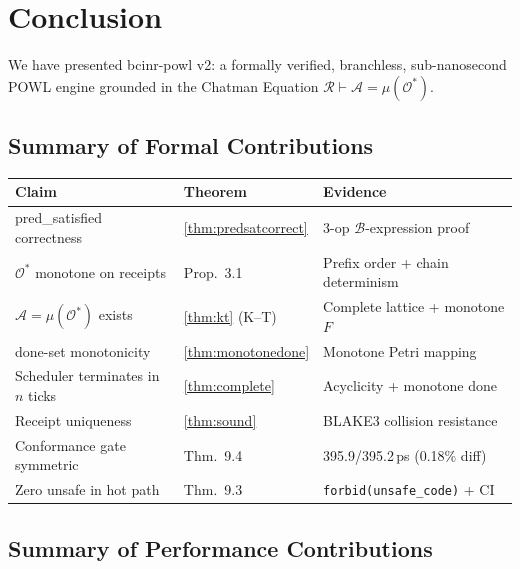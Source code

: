 \documentclass[12pt,a4paper]{article}
\theoremstyle{definition}
\theoremstyle{remark}
\newcommand{\Ostar}{\mathcal{O}^{*}}
\newcommand{\Agency}{\mathcal{A}}
\newcommand{\Reality}{\mathcal{R}}
\begin{document}
\section{Conclusion}
\label{sec:conclusion}

We have presented bcinr-powl v2: a formally verified, branchless,
sub-nanosecond POWL engine grounded in the Chatman Equation
$\Reality \vdash \Agency = \mu(\Ostar)$.

\subsection{Summary of Formal Contributions}

\begin{center}
\renewcommand{\arraystretch}{1.1}
\begin{tabular}{p{5.5cm}lp{5.5cm}}
\toprule
\textbf{Claim} & \textbf{Theorem} & \textbf{Evidence} \\
\midrule
pred\_satisfied correctness & \ref{thm:predsatcorrect} & 3-op $\mathcal{B}$-expression proof \\
$\Ostar$ monotone on receipts & Prop.\ 3.1 & Prefix order + chain determinism \\
$\Agency = \mu(\Ostar)$ exists & \ref{thm:kt} (K--T) & Complete lattice + monotone $F$ \\
done-set monotonicity & \ref{thm:monotonedone} & Monotone Petri mapping \\
Scheduler terminates in $n$ ticks & \ref{thm:complete} & Acyclicity + monotone done \\
Receipt uniqueness & \ref{thm:sound} & BLAKE3 collision resistance \\
Conformance gate symmetric & Thm.\ 9.4 & 395.9/395.2\,ps (0.18\% diff) \\
Zero unsafe in hot path & Thm.\ 9.3 & \texttt{forbid(unsafe\_code)} + CI \\
\bottomrule
\end{tabular}
\end{center}

\subsection{Summary of Performance Contributions}
\end{document}
